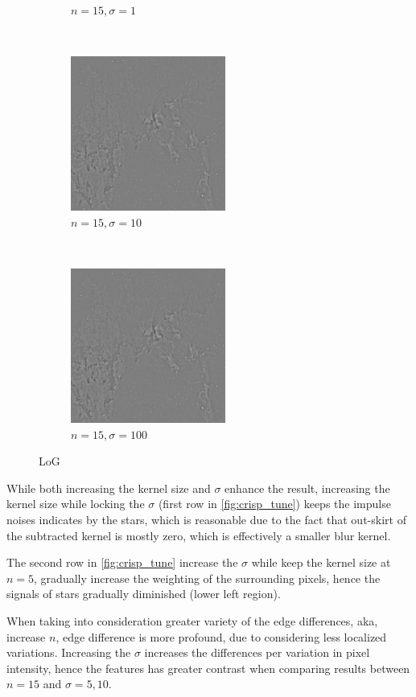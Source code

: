 \documentclass[12pt]{article}
\begin{document}
\begin{figure}[H]
\begin{subfigure}[t]{0.3\textwidth}
        \caption{$n=15, \sigma=1$}
    \end{subfigure}%
    ~ 
    \begin{subfigure}[t]{0.3\textwidth}
        \centering
        \includegraphics[height=2in]{images/crisp_n15s10}
        \caption{$n=15, \sigma=10$}
    \end{subfigure}%
    ~
    \begin{subfigure}[t]{0.3\textwidth}
        \centering
        \includegraphics[height=2in]{images/crisp_n15s100}
        \caption{$n=15, \sigma=100$}
    \end{subfigure}%
    \caption{LoG}
    \label{fig:crisp_tune}
\end{figure}

While both increasing the kernel size and $\sigma$ enhance the result, increasing the kernel size while locking the $\sigma$ (first row in \autoref{fig:crisp_tune}) keeps the impulse noises indicates by the stars, which is reasonable due to the fact that out-skirt of the subtracted kernel is mostly zero, which is effectively a smaller blur kernel.

The second row in \autoref{fig:crisp_tune} increase the $\sigma$ while keep the kernel size at $n=5$, gradually increase the weighting of the surrounding pixels, hence the signals of stars gradually diminished (lower left region). 

When taking into consideration greater variety of the edge differences, aka, increase $n$, edge difference is more profound, due to considering less localized variations.
Increasing the $\sigma$ increases the differences per variation in pixel intensity, hence the features has greater contrast when comparing results between $n=15$ and $\sigma=5, 10$.
\end{document}
